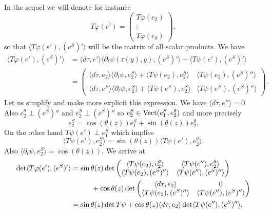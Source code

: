 \documentclass[10pt]{amsart}
\theoremstyle{plain}
\theoremstyle{definition}
\let\di\displaystyle
\begin{document}
\noindent
In the sequel we will denote for instance\vspace*{-3pt}
\[
\di T\varphi(e')=\left(\begin{matrix}T\varphi(e_2)\\ \vdots\\ T\varphi(e_d)\end{matrix}\right),
\]
so that $\langle T\varphi(e'), (e^S)'\rangle$ will be the matrix of all scalar products.
We have\vspace*{-3pt}
\begin{align*}
\langle T\varphi(e'), (e^S)'\rangle &=\langle d\tau,e'\rangle\langle \partial_t\psi(\tau(y),y), (e^S)'\rangle+ \langle T\psi(e'),(e^S)'\rangle\\
&=\left(\begin{matrix}
\langle d\tau,e_2\rangle\langle \partial_t\psi, e_2^S\rangle+\langle T\psi(e_2), e_2^S\rangle&
\langle T\psi(e_2),(e^S)''\rangle\\
\langle d\tau,e''\rangle\langle\partial_t\psi, e_2^S\rangle+\langle T\psi (e''), e_2^S\rangle
& \langle T\psi(e''),(e^S)''\rangle
\end{matrix}
\right).
\end{align*}
Let us simplify and make more explicit this expression.
We have $\langle d\tau,e''\rangle=0$. Also $e_2^\theta\perp (e^S)''$ and $e_2^S\perp (e^S)''$ so $e_2^S\in {\rm Vect}(e_1^S, e_2^\theta)$ and more precisely
\begin{equation}
e_2^S=\cos(\theta(z)) e_1^S+\sin(\theta(z))e_2^\theta.
\end{equation}
On the other hand $T\psi(e')\perp e_1^S$ which implies
\begin{equation}
\langle T\psi(e'),e_2^S\rangle =\sin(\theta(z))\langle T\psi(e'), e_2^\theta\rangle.
\end{equation}
Also $\langle \partial_t\psi, e_2^S\rangle =\cos(\theta(z)).$ We arrive at
\begin{equation}
\begin{split}
\det\langle T\varphi(e'),(e^S)'\rangle&=\sin\theta(z)\det\left(
\begin{matrix}
\langle T\psi(e_2), e_2^\theta\rangle &\langle T\psi(e''),e_2^\theta\rangle\\
\langle T\psi(e_2),(e^S)''\rangle & \langle T\psi(e''),(e^S)''\rangle
\end{matrix}
\right)\\
&\hspace*{1cm}+\cos\theta(z)\det\left(\begin{matrix}
\langle d\tau, e_2\rangle &{0}\\
\langle T\psi(e_2), (e^S)''\rangle & \langle T\psi(e''), (e^S)''\rangle
\end{matrix}
\right)\\
&= \sin\theta(z)\det T\psi+\cos\theta(z) \langle d\tau, e_2\rangle \det \langle T\psi(e''),(e^S)''\rangle.
\end{split}
\end{equation}
\end{document}
